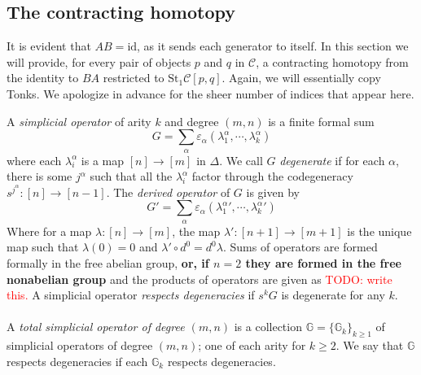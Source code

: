 \documentclass[12pt]{article}
\theoremstyle{definition}
\newcommand{\TODO}[1]{\textcolor{red}{TODO: {#1}}}
\newcommand{\C}{\mathcal{C}}
\newcommand{\id}{\text{id}}
\begin{document}
\subsection{The contracting homotopy}
	It is evident that $AB = \id$, as it sends each generator to itself. In this section we will provide, for every pair of objects $p$ and $q$ in $\C$, a contracting homotopy from the identity to $BA$ restricted to $\text{St}_1 \C[p,q]$. Again, we will essentially copy Tonks. We apologize in advance for the sheer number of indices that appear here. 
	
	A \emph{simplicial operator} of arity $k$ and degree $(m,n)$ is a finite formal sum
	$$G = \sum_{\alpha} \varepsilon_\alpha( \lambda^\alpha_1, \cdots, \lambda^\alpha_k )$$
	where each $\lambda^\alpha_i$ is a map $[n] \to [m]$ in $\Delta$. 
	We call $G$ \emph{degenerate} if for each $\alpha$, there is some $j^\alpha$ such that all the $\lambda^\alpha_i$ factor through the codegeneracy $s^{j^{\alpha}}: [n] \to [n-1]$. The \emph{derived operator} of $G$ is given by 
	$$G' = \sum_{\alpha} \varepsilon_\alpha( {\lambda^\alpha_1}', \cdots, {\lambda^\alpha_k}')$$
	Where for a map $\lambda: [n] \to [m]$, the map $\lambda': [n+1] \to [m+1]$ is the unique map such that $\lambda(0) = 0$ and $\lambda' \circ d^0 = d^0 \lambda$.
	Sums of operators are formed formally in the free abelian group, \textbf{or, if $n = 2$ they are formed in the free nonabelian group} and the products of operators are given as \TODO{write this.} A simplicial operator \textit{respects degeneracies} if $s^kG$ is degenerate for any $k$.
	\\\\
	A \emph{total simplicial operator of degree $(m,n)$} is a collection $\mathbb{G} = \{\mathbb{G}_k\}_{k \ge 1}$ of simplicial operators of degree $(m,n)$; one of each arity for $k\ge 2$. We say that $\mathbb{G}$ respects degeneracies if each $\mathbb{G}_k$ respects degeneracies. 
\end{document}
